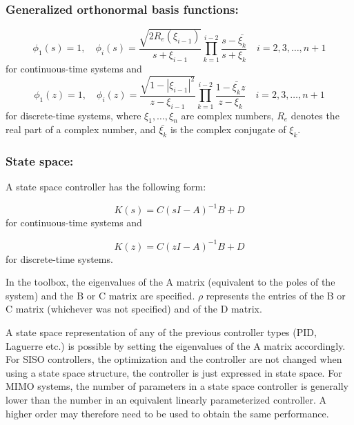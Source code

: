 \documentclass [12pt , a4paper] {report}
\begin{document}
\subsubsection{Generalized orthonormal basis functions:}

\begin{equation}
\phi_1(s)=1, \quad \phi_i(s)=\frac{\sqrt{2R_e(\xi_{i-1})}}{s+\xi_{i-1}} \prod_{k=1}^{i-2}\frac{s-\bar{\xi_k}}{s+\xi_k} \quad  i=2,3,\ldots,n+1 
\end{equation}
for continuous-time systems and
\begin{equation}
\phi_1(z)=1, \quad \phi_i(z)=\frac{\sqrt{1-|\xi_{i-1}|^2}}{z-\xi_{i-1}} \prod_{k=1}^{i-2}\frac{1-\bar{\xi_k}z}{z-\xi_k} \quad  i=2,3,\ldots,n+1 
\end{equation}
for discrete-time systems,
where $\xi_1, \ldots, \xi_n$ are complex numbers, $R_e$ denotes the real part of a complex number, and $\bar{\xi_k}$ is the complex conjugate of $\xi_k$.

\subsubsection{State space:}
A state space controller has the following form:

\begin{equation}
    K(s) = C \left(s I - A\right)^{-1} B + D
\end{equation}
for continuous-time systems and 

\begin{equation}
    K(z) = C \left(z I - A\right)^{-1} B + D
\end{equation}
for discrete-time systems.

In the toolbox, the eigenvalues of the A matrix (equivalent to the poles of the system) and the B or C matrix are specified. $\rho$ represents the entries of the B or C matrix (whichever was not specified) and of the D matrix.

A state space representation of any of the previous controller types (PID, Laguerre etc.) is possible by setting the eigenvalues of the A matrix accordingly. For SISO controllers, the optimization and the controller are not changed when using a state space structure, the controller is just expressed in state space. For MIMO systems, the number of parameters in a state space controller is generally lower than the number in an equivalent linearly parameterized controller. A higher order may therefore need to be used to obtain the same performance. 
\end{document}
